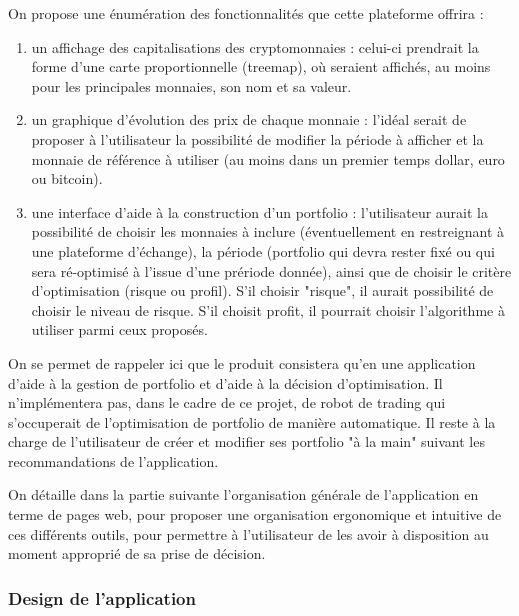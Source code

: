 \documentclass[a4paper]{article}
\begin{document}
On propose une énumération des fonctionnalités que cette plateforme offrira :
\begin{enumerate}
    \item un affichage des capitalisations des cryptomonnaies : celui-ci prendrait la forme d'une carte proportionnelle (treemap), où seraient affichés, au moins pour les principales monnaies, son nom et sa valeur.
    \item un graphique d'évolution des prix de chaque monnaie : l'idéal serait de proposer à l'utilisateur la possibilité de modifier la période à afficher et la monnaie de référence à utiliser (au moins dans un premier temps dollar, euro ou bitcoin).
    \item une interface d'aide à la construction d'un portfolio : l'utilisateur aurait la possibilité de choisir les monnaies à inclure (éventuellement en restreignant à une plateforme d'échange), la période (portfolio qui devra rester fixé ou qui sera ré-optimisé à l'issue d'une prériode donnée), ainsi que de choisir le critère d'optimisation (risque ou profil). S'il choisir "risque", il aurait possibilité de choisir le niveau de risque. S'il choisit profit, il pourrait choisir l'algorithme à utiliser parmi ceux proposés.
\end{enumerate}\medskip

On se permet de rappeler ici que le produit consistera qu'en une application d'aide à la gestion de portfolio et d'aide à la décision d'optimisation. Il n'implémentera pas, dans le cadre de ce projet, de robot de trading qui s'occuperait de l'optimisation de portfolio de manière automatique. Il reste à la charge de l'utilisateur de créer et modifier ses portfolio "à la main" suivant les recommandations de l'application.

On détaille dans la partie suivante l'organisation générale de l'application en terme de pages web, pour proposer une organisation ergonomique et intuitive de ces différents outils, pour permettre à l'utilisateur de les avoir à disposition au moment approprié de sa prise de décision.

\subsubsection{Design de l'application}
\end{document}
